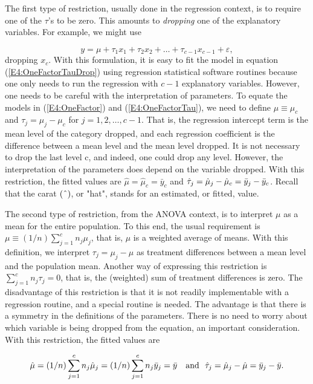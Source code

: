 The first type of restriction, usually done in the regression context, is to
require one of the $\tau $'s to be zero. This amounts to \textit{dropping}
one of the explanatory variables. For example, we might use

\begin{equation}  \label{E4:OneFactorTauDrop}
y=\mu +\tau_1x_1+\tau_2x_2+\ldots +\tau _{c-1}x_{c-1}+\varepsilon,
\end{equation}%
dropping $x_{c}$. With this formulation, it is easy to fit the model
in equation (\ref{E4:OneFactorTauDrop}) using regression statistical
software routines because one only needs to run the regression with
$c-1$ explanatory variables. However, one needs to be careful with
the interpretation of parameters. To equate the models in
(\ref{E4:OneFactor}) and (\ref{E4:OneFactorTau}), we need to define
$\mu \equiv \mu_c$ and $\tau_{j}=\mu_{j}-\mu_c$ for $j=1,2,\ldots
,c-1$. That is, the regression intercept term is the mean level of
the category dropped, and each regression coefficient is the
difference between a mean level and the mean level dropped. It is
not necessary to drop the last level c, and indeed, one could drop
any level. However, the interpretation of the parameters does depend
on the variable dropped. With this restriction, the fitted values
are
$\hat{\mu}=\hat{\mu}_{c}=\bar{y}_{c}$ and $\hat{\tau}_{j}=\hat{\mu}_{j}-\hat{%
\mu}_{c}=\bar{y}_{j}-\bar{y}_{c}$. Recall that the carat $(\symbol{94})$, or
"hat", stands for an estimated, or fitted, value.

The second type of restriction, from the ANOVA context, is to
interpret $\mu $ as a mean for the entire population. To this end,
the usual requirement is $\mu \equiv
(1/n)\sum_{j=1}^{c}n_{j}\mu_{j}$, that is, $\mu $ is a weighted
average of means. With this definition, we interpret $\tau_{j}=\mu
_{j}-\mu $ as treatment differences between a mean level and the
population mean. Another way of expressing this restriction is
$\sum_{j=1}^{c}n_{j}\tau_{j}=0 $, that is, the (weighted) sum of
treatment differences is zero. The disadvantage of this restriction
is that it is not readily implementable with a regression routine,
and a special routine is needed. The advantage is that there is a
symmetry in the definitions of the parameters. There is no need to
worry about which variable is being dropped from the equation, an
important consideration. With this restriction, the fitted values
are

\begin{equation*}
\hat{\mu}=(1/n)\sum_{j=1}^{c}n_{j}\hat{\mu}_{j}=(1/n)\sum_{j=1}^{c}n_{j}\bar{%
y}_{j}=\bar{y}\text{ \ \ and \ }\hat{\tau}_{j}=\hat{\mu}_{j}-\hat{\mu}=\bar{y%
}_{j}-\bar{y}.
\end{equation*}

